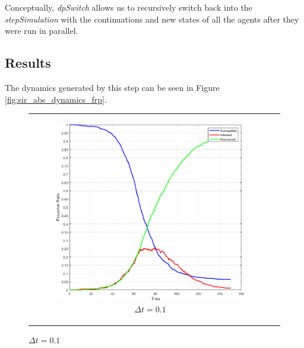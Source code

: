Conceptually, \textit{dpSwitch} allows us to recursively switch back into the \textit{stepSimulation} with the continuations and new states of all the agents after they were run in parallel. 

\subsection{Results}
The dynamics generated by this step can be seen in Figure \ref{fig:sir_abs_dynamics_frp}. 

\begin{figure}
\begin{center}
	\begin{tabular}{c c}
		\begin{subfigure}[b]{0.4\textwidth}
			\centering
			\includegraphics[width=1\textwidth, angle=0]{./fig/timedriven/SIR_Yampa/SIR_Yampa_dt01.png}
			\caption{$\Delta t = 0.1$}
			\label{fig:sir_abs_approximating_01dt_1000agents}
		\end{subfigure}
		
		&
    	

\end{tabular}
\end{center}
\end{figure}
